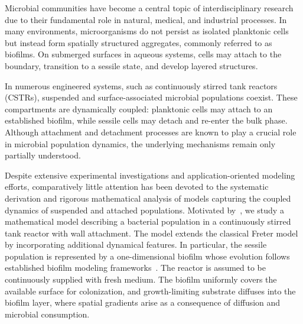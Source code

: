 \documentclass[reqno,11pt]{amsart}
\numberwithin{equation}{section}
\begin{document}
Microbial communities have become a central topic of interdisciplinary research due to their fundamental role in natural, medical, and industrial processes. In many environments, microorganisms do not persist as isolated planktonic cells but instead form spatially structured aggregates, commonly referred to as biofilms. On submerged surfaces in aqueous systems, cells may attach to the boundary, transition to a sessile state, and develop layered structures.

In numerous engineered systems, such as continuously stirred tank reactors (CSTRs), suspended and surface-associated microbial populations coexist. These compartments are dynamically coupled: planktonic cells may attach to an established biofilm, while sessile cells may detach and re-enter the bulk phase. Although attachment and detachment processes are known to play a crucial role in microbial population dynamics, the underlying mechanisms remain only partially understood.

Despite extensive experimental investigations and application-oriented modeling efforts, comparatively little attention has been devoted to the systematic derivation and rigorous mathematical analysis of models capturing the coupled dynamics of suspended and attached populations. Motivated by~\cite{MasicEberl12}, we study a mathematical model describing a bacterial population in a continuously stirred tank reactor with wall attachment.
The model extends the classical Freter model~\cite{Freter,Jones03,BallykJonesSmith,Stemmons} by incorporating additional dynamical features. In particular, the sessile population is represented by a one-dimensional biofilm whose evolution follows established biofilm modeling frameworks~\cite{Jones03,WannerGujer86,WannerEtAl06,KD10}. The reactor is assumed to be continuously supplied with fresh medium. The biofilm uniformly covers the available surface for colonization, and growth-limiting substrate diffuses into the biofilm layer, where spatial gradients arise as a consequence of diffusion and microbial consumption.
\end{document}
